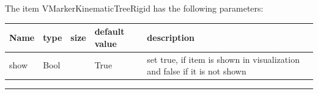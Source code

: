 The item VMarkerKinematicTreeRigid has the following parameters:\vspace{-1cm}\\ 
\begin{center}
  \footnotesize
  \begin{longtable}{| p{4.5cm} | p{2.5cm} | p{0.5cm} | p{2.5cm} | p{6cm} |}
    \hline
    \bf Name & \bf type & \bf size & \bf default value & \bf description \\ \hline
    show &     Bool &      &     True &     set true, if item is shown in visualization and false if it is not shown\\ \hline
	  \end{longtable}
	\end{center}
\par\noindent\rule{\textwidth}{0.4pt}
\label{description_MarkerKinematicTreeRigid}
